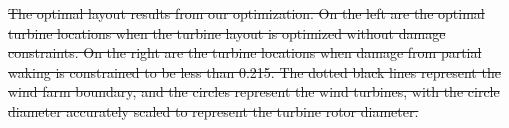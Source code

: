 \documentclass[11pt,letterpaper]{article}
\providecommand{\DIFdel}[1]{{\protect\color{red}\sout{#1}}}                      %
\providecommand{\DIFdelFL}[1]{\DIFdel{#1}} %
\begin{document}
{%
\DIFdelFL{The optimal layout results from our optimization. On the left are the optimal turbine locations when the turbine layout is optimized without damage constraints. On the right are the turbine locations when damage from partial waking is constrained to be less than 0.215. The dotted black lines represent the wind farm boundary, and the circles represent the wind turbines, with the circle diameter accurately scaled to represent the turbine rotor diameter.}}
\end{document}
